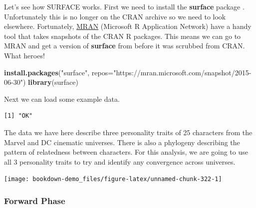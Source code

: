 \documentclass[
]{book}
\newenvironment{Shaded}{\begin{snugshade}}{\end{snugshade}}
\newcommand{\DataTypeTok}[1]{\textcolor[rgb]{0.13,0.29,0.53}{#1}}
\newcommand{\KeywordTok}[1]{\textcolor[rgb]{0.13,0.29,0.53}{\textbf{#1}}}
\newcommand{\NormalTok}[1]{#1}
\newcommand{\OperatorTok}[1]{\textcolor[rgb]{0.81,0.36,0.00}{\textbf{#1}}}
\newcommand{\StringTok}[1]{\textcolor[rgb]{0.31,0.60,0.02}{#1}}
\begin{document}
Let's see how SURFACE works. First we need to install the \textbf{surface} package \citep{surface}. Unfortunately this is no longer on the CRAN archive so we need to look elsewhere. Fortunately, \href{https://mran.microsoft.com/}{MRAN} (Microsoft R Application Network) have a handy tool that takes snapshots of the CRAN R packages. This means we can go to MRAN and get a version of \textbf{surface} from before it was scrubbed from CRAN. What heroes!

\begin{Shaded}
\begin{Highlighting}[]
\KeywordTok{install.packages}\NormalTok{(}\StringTok{"surface"}\NormalTok{, }\DataTypeTok{repos=}\StringTok{"https://mran.microsoft.com/snapshot/2015{-}06{-}30"}\NormalTok{)}
\KeywordTok{library}\NormalTok{(surface)}
\end{Highlighting}
\end{Shaded}

Next we can load some example data.

\begin{Shaded}
\end{Shaded}

\begin{verbatim}
[1] "OK"
\end{verbatim}

The data we have here describe three personality traits of 25 characters from the Marvel and DC cinematic universes. There is also a phylogeny describing the pattern of relatedness between characters. For this analysis, we are going to use all 3 personality traits to try and identify any convergence across universes.

\begin{center}\texttt{[image: bookdown-demo\_files/figure-latex/unnamed-chunk-322-1]} \end{center}

\hypertarget{forward-phase}{%
\subsubsection{Forward Phase}\label{forward-phase}}
\end{document}
